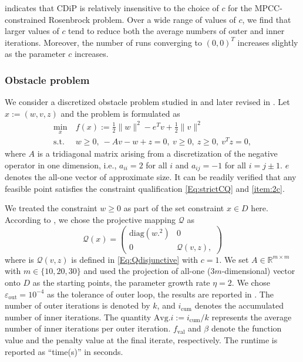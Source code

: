 \documentclass[11pt,a4paper,reqno]{amsart}
\begin{document}
{ indicates that CDiP is relatively insensitive to the choice of $c$ for the MPCC-constrained Rosenbrock problem. Over a wide range of values of $c$, we find that larger values of $c$ tend to reduce both the average numbers of outer and inner iterations. Moreover, the number of runs converging to $(0,0)^T$ increases slightly as the parameter $c$ increases.

\subsubsection{Obstacle problem}
    \rm We consider a discretized obstacle problem studied in \cite[Section~7.4]{harder2021reformulation} and later revised in \cite[Example~6.2]{jia2023augmented}. Let $x:=(w,v,z)$ and the problem is formulated as
    \begin{equation*}
    \begin{aligned}
        \min_x \ &f(x):=\frac{1}{2}\|w\|^2-e^Tv+\frac{1}{2}\|v\|^2\\
        \text{s.t.} \ & w \geq 0,\ -Av-w+z=0,\ v \geq 0, \ z\geq 0, \ v^Tz=0,
        \end{aligned}
    \end{equation*}
    where $A$ is a tridiagonal matrix arising from a discretization of the negative operator in one dimension, i.e., $a_{ii}=2$ for all $i$ and $a_{ij}=-1$ for all $i=j \pm 1$. $e$ denotes the all-one vector of approximate size. It can be readily verified that any feasible point satisfies the constraint qualification \eqref{Eq:strictCQ} and  \ref{item:2c}.

    We treated the constraint $w\geq 0$ as part of the set constraint $x\in D$ here. According to \cite[Proposition~6.41]{rockafellar1998variational}, we chose the projective mapping $\mathcal Q$ as
    \begin{equation}
        \mathcal Q(x) =
        \begin{pmatrix}
            \text{diag}({w.}^2) & 0\\
            0 & \mathcal Q(v,z),
        \end{pmatrix}
    \end{equation}
    where is $\mathcal Q(v,z)$ is defined in \eqref{Eq:Qdisjunctive} with $c=1$. 
    We set $A\in \mathbb R^{m \times m}$ with $m\in \{10, 20, 30\}$ and used the projection of all-one ($3m$-dimensional) vector onto $D$ as the starting points, the parameter growth rate $\eta=2$. We chose $\varepsilon_{\text{out}}=10^{-4}$ as the tolerance of outer loop, the results are reported in . The number of outer iterations is denoted by $k$, and $i_{\text{cum}}$ denotes the accumulated number of inner iterations. The quantity $\text{Avg}.i:=i_{\text{cum}} / k$ represents the average number of inner iterations per outer iteration. $f_\text{val}$ and $\beta$ denote the function value and the penalty value at the final iterate, respectively. The runtime is reported as ``time(s)” in seconds.

}
\end{document}

